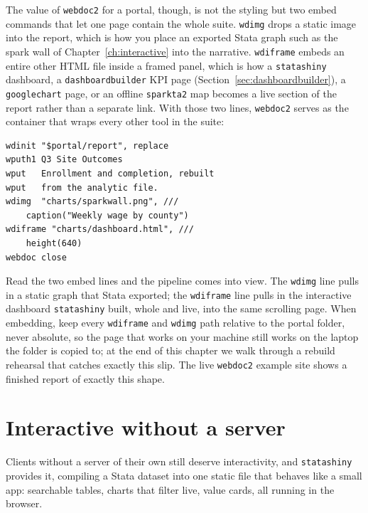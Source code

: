 The value of \texttt{webdoc2} for a portal, though, is not the styling but two embed commands that let one page contain the whole suite. \texttt{wdimg} drops a static image into the report, which is how you place an exported Stata graph such as the spark wall of Chapter~\ref{ch:interactive} into the narrative. \texttt{wdiframe} embeds an entire other HTML file inside a framed panel, which is how a \texttt{statashiny} dashboard, a \texttt{dashboardbuilder} KPI page (Section~\ref{sec:dashboardbuilder}), a \texttt{googlechart} page, or an offline \texttt{sparkta2} map becomes a live section of the report rather than a separate link. With those two lines, \texttt{webdoc2} serves as the container that wraps every other tool in the suite:
\par
{\footnotesize
\begin{verbatim}
wdinit "$portal/report", replace
wputh1 Q3 Site Outcomes
wput   Enrollment and completion, rebuilt
wput   from the analytic file.
wdimg  "charts/sparkwall.png", ///
    caption("Weekly wage by county")
wdiframe "charts/dashboard.html", ///
    height(640)
webdoc close
\end{verbatim}
}
Read the two embed lines and the pipeline comes into view. The \texttt{wdimg} line pulls in a static graph that Stata exported; the \texttt{wdiframe} line pulls in the interactive dashboard \texttt{statashiny} built, whole and live, into the same scrolling page. When embedding, keep every \texttt{wdiframe} and \texttt{wdimg} path relative to the portal folder, never absolute, so the page that works on your machine still works on the laptop the folder is copied to; at the end of this chapter we walk through a rebuild rehearsal that catches exactly this slip. The live \texttt{webdoc2} example site shows a finished report of exactly this shape.

\section{Interactive without a server}
Clients without a server of their own still deserve interactivity, and \texttt{statashiny} provides it, compiling a Stata dataset into one static file that behaves like a small app: searchable tables, charts that filter live, value cards, all running in the browser.

